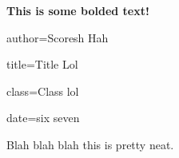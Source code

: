 \documentclass[letterpaper]{article}
\newcommand{\titleDOC}{}
\newcommand{\authorDOC}{Daniel Sabalakov}
\newcommand{\classDOC}{}
\begin{document}








\renewcommand{\titleDOC}{Example Title}

\renewcommand{\authorDOC}{Daniel Sabalakov}

\renewcommand{\classDOC}{DE Macroeconomics}



\tableofcontents

 \textbf{This is some bolded text!} 

author=Scoresh Hah

title=Title Lol

class=Class lol

date=six seven

Blah blah blah this is pretty neat.

\newpage

\newpage
\end{document}
